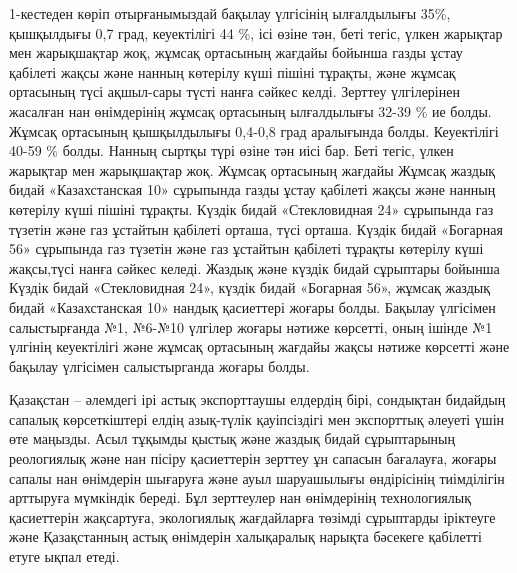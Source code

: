 {{%

1-кестеден көріп отырғанымыздай бақылау үлгісінің ылғалдылығы 35\%,
қышқылдығы 0,7 град, кеуектілігі 44 \%, ісі өзіне тән, беті тегіс, үлкен
жарықтар мен жарықшақтар жоқ, жұмсақ ортасының жағдайы бойынша газды
ұстау қабілеті жақсы және нанның көтерілу күші пішіні тұрақты, және
жұмсақ ортасының түсі ақшыл-сары түсті нанға сәйкес келді. Зерттеу
үлгілерінен жасалған нан өнімдерінің жұмсақ ортасының ылғалдылығы 32-39
\% ие болды. Жұмсақ ортасының қышқылдылығы 0,4-0,8 град аралығында
болды. Кеуектілігі 40-59 \% болды. Нанның сыртқы түрі өзіне тән иісі
бар. Беті тегіс, үлкен жарықтар мен жарықшақтар жоқ. Жұмсақ ортасының
жағдайы Жұмсақ жаздық бидай «Казахстанская 10» сұрыпында газды ұстау
қабілеті жақсы және нанның көтерілу күші пішіні тұрақты. Күздік бидай
«Стекловидная 24» сұрыпында газ түзетін және газ ұстайтын қабілеті
орташа, түсі орташа. Күздік бидай «Богарная 56» сұрыпында газ түзетін
және газ ұстайтын қабілеті тұрақты көтерілу күші жақсы,түсі нанға сәйкес
келеді. Жаздық және күздік бидай сұрыптары бойынша Күздік бидай
«Стекловидная 24», күздік бидай «Богарная 56», жұмсақ жаздық бидай
«Казахстанская 10» нандық қасиеттері жоғары болды. Бақылау үлгісімен
салыстырғанда №1, №6-№10 үлгілер жоғары нәтиже көрсетті, оның ішінде №1
үлгінің кеуектілігі және жұмсақ ортасының жағдайы жақсы нәтиже көрсетті
және бақылау үлгісімен салыстырганда жоғары болды.

Қазақстан -- әлемдегі ірі астық экспорттаушы елдердің бірі, сондықтан
бидайдың сапалық көрсеткіштері елдің азық-түлік қауіпсіздігі мен
экспорттық әлеуеті үшін өте маңызды. Асыл тұқымды қыстық және жаздық
бидай сұрыптарының реологиялық және нан пісіру қасиеттерін зерттеу ұн
сапасын бағалауға, жоғары сапалы нан өнімдерін шығаруға және ауыл
шаруашылығы өндірісінің тиімділігін арттыруға мүмкіндік береді. Бұл
зерттеулер нан өнімдерінің технологиялық қасиеттерін жақсартуға,
экологиялық жағдайларға төзімді сұрыптарды іріктеуге және Қазақстанның
астық өнімдерін халықаралық нарықта бәсекеге қабілетті етуге ықпал
етеді.

}}
